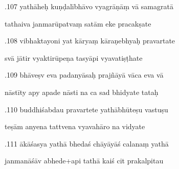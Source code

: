 \documentclass[article,12pt,a4paper]{memoir}%
\newcounter{parCount}
\begin{document}
	  
	  \pstart {}.107 yathāheḥ kuṇḍalībhāvo vyagrāṇāṃ vā samagratā 
	{}
	\pend%
      

	  
	  \pstart \leavevmode%
	tathaiva janmarūpatvaṃ satām eke pracakṣate 
	{}
	\pend%
      

	  
	  \pstart {}.108 vibhaktayoni yat kāryaṃ kāraṇebhyaḥ pravartate 
	{}
	\pend%
      

	  
	  \pstart \leavevmode%
	svā jātir vyaktirūpeṇa tasyāpi vyavatiṣṭhate 
	{}
	\pend%
      

	  
	  \pstart {}.109 bhāveṣv eva padanyāsaḥ prajñāyā vāca eva vā 
	{}
	\pend%
      

	  
	  \pstart \leavevmode%
	nāstīty apy apade nāsti na ca sad bhidyate tataḥ 
	{}
	\pend%
      

	  
	  \pstart {}.110 buddhiśabdau pravartete yathābhūteṣu vastuṣu 
	{}
	\pend%
      

	  
	  \pstart \leavevmode%
	teṣām anyena tattvena vyavahāro na vidyate 
	{}
	\pend%
      

	  
	  \pstart {}.111 ākāśasya yathā bhedaś chāyāyāś calanaṃ yathā 
	{}
	\pend%
      

	  
	  \pstart \leavevmode%
	janmanāśāv abhede+api tathā kaiś cit prakalpitau 
	{}
	\pend%
      
\end{document}
